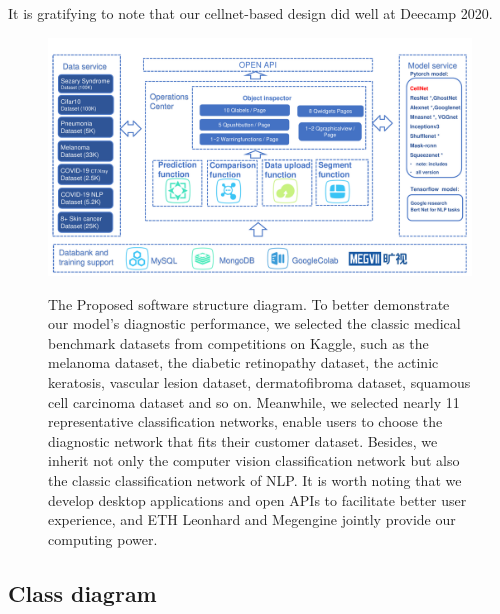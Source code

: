 It is gratifying to note that our cellnet-based design did well at  Deecamp 2020.
\begin{figure}[t]
\begin{center}
\includegraphics[height=0.35\textheight]{thesis-template-master/images/2020DeeCamp_ppt_tcy (1).pdf}
\label{fig:cellnet}
\end{center}
\caption{ The Proposed software structure diagram.
To better demonstrate our model's diagnostic performance, we selected the classic medical benchmark datasets from competitions on Kaggle, such as the melanoma dataset, the diabetic retinopathy dataset, the actinic keratosis, vascular lesion dataset, dermatofibroma dataset, squamous cell carcinoma dataset and so on. Meanwhile, we selected nearly 11  representative classification networks, enable users to choose the diagnostic network that fits their customer dataset. Besides, we inherit not only the computer vision classification network but also the classic classification network of NLP. It is worth noting that we develop desktop applications and open APIs to facilitate better user experience, and ETH Leonhard and Megengine jointly provide our computing power.}
\end{figure}

\subsection{Class diagram} %
\label{sub:amet}

